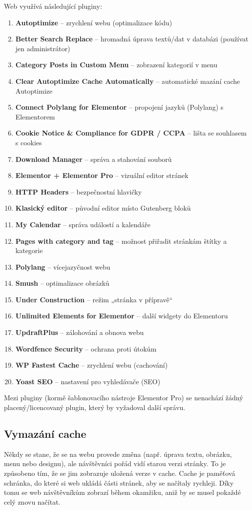 \documentclass[12pt,a4paper]{article}
\begin{document}
	Web využívá následující pluginy:
	\begin{enumerate}
		\item \textbf{Autoptimize} – zrychlení webu (optimalizace kódu)
		\item \textbf{Better Search Replace} – hromadná úprava textů/dat v databázi (používat jen administrátor)
		\item \textbf{Category Posts in Custom Menu} – zobrazení kategorií v menu
		\item \textbf{Clear Autoptimize Cache Automatically} – automatické mazání cache Autoptimize
		\item \textbf{Connect Polylang for Elementor} – propojení jazyků (Polylang) s Elementorem
		\item \textbf{Cookie Notice \& Compliance for GDPR / CCPA} – lišta se souhlasem s cookies
		\item \textbf{Download Manager} – správa a stahování souborů
		\item \textbf{Elementor + Elementor Pro} – vizuální editor stránek
		\item \textbf{HTTP Headers} – bezpečnostní hlavičky
		\item \textbf{Klasický editor} – původní editor místo Gutenberg bloků
		\item \textbf{My Calendar} – správa událostí a kalendáře
		\item \textbf{Pages with category and tag} – možnost přiřadit stránkám štítky a kategorie
		\item \textbf{Polylang} – vícejazyčnost webu
		\item \textbf{Smush} – optimalizace obrázků
		\item \textbf{Under Construction} – režim „stránka v přípravě“
		\item \textbf{Unlimited Elements for Elementor} – další widgety do Elementoru
		\item \textbf{UpdraftPlus} – zálohování a obnova webu
		\item \textbf{Wordfence Security} – ochrana proti útokům
		\item \textbf{WP Fastest Cache} – zrychlení webu (cachování)
		\item \textbf{Yoast SEO} – nastavení pro vyhledávače (SEO)
	\end{enumerate}
	
	Mezi pluginy (kormě šablonovacího nástroje Elementor Pro) se nenachází žádný placený/licencovaný plugin, který by vyžadoval další správu.
	
	\subsection{Vymazání cache}
	Někdy se stane, že se na webu provede změna (např. úprava textu, obrázku, menu nebo designu), ale návštěvníci pořád vidí starou verzi stránky. To je způsobeno tím, že se jim zobrazuje uložená verze v cache. Cache je paměťová schránka, do které si web ukládá části stránek, aby se načítaly rychleji. Díky tomu se web návštěvníkům zobrazí během okamžiku, aniž by se musel pokaždé celý znovu načítat.
	
\end{document}
